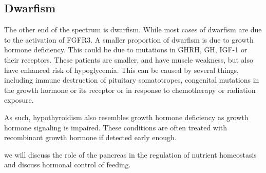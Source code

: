\documentclass{tufte-handout}
\begin{document}
\subsection{Dwarfism}

The other end of the spectrum is dwarfism.  While most cases of dwarfism are due to the activation of FGFR3\cite{Shiang1994}.  A smaller proportion of dwarfism is due to growth hormone deficiency.  This could be due to mutations in GHRH, GH, IGF-1 or their receptors.  These patients are smaller, and have muscle weakness, but also have enhanced risk of hypoglycemia.  This can be caused by several things, including immune destruction of pituitary somatotropes, congenital mutations in the growth hormone or its receptor or in response to chemotherapy or radiation exposure. 

  As such, hypothyroidism also resembles growth hormone deficiency as growth hormone signaling is impaired.  These conditions are often treated with recombinant growth hormone if detected early enough.

 we will discuss the role of the pancreas in the regulation of nutrient homeostasis and discuss hormonal control of feeding.
\listoffigures
\listoftables



\end{document}
